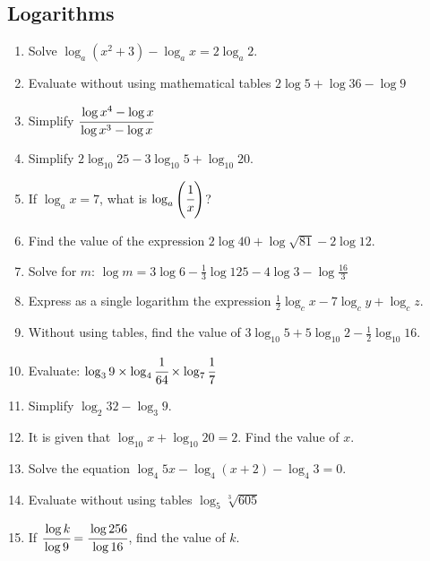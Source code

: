 	
	
	\subsection{Logarithms}
\begin{enumerate}

	\item Solve $\log_a(x^2 + 3) - \log_ax = 2\log_a2$.
	
	\item Evaluate without using mathematical tables $2\log 5 + \log 36 - \log 9$	
	
	\item Simplify $\cfrac{\log x^4 - \log x}{\log x^3 - \log x}$

	\item Simplify $2\log_{10} 25 - 3\log_{10} 5 + \log_{10} 20$.
	
	\item If $\log_a x = 7$, what is $\log_a \left(\cfrac{1}{x}\right)$?
	
	\item Find the value of the expression $2\log 40 + \log \sqrt{81} - 2\log 12$.
	
	\item Solve for $m$: $\log m = 3\log 6 - \frac{1}{3}\log 125 - 4\log 3 - \log \frac{16}{3}$

	\item Express as a single logarithm the expression $\frac{1}{2}\log_c x - 7\log_c y + \log_c z$.
	
	\item Without using tables, find the value of $3\log_{10} 5 + 5\log_{10} 2 - \frac{1}{2}\log_{10} 16$.
	
	\item Evaluate: $\log_3 9 \times \log_4 \cfrac{1}{64} \times \log_7 \cfrac{1}{7}$
	
	\item Simplify $\log_2 32 - \log_3 9$.
	
	\item It is given that $\log_{10} x + \log_{10} 20 = 2$. Find the value of $x$.
	
	\item Solve the equation $\log_4 5x - \log_4 (x + 2) - \log_4 3 = 0$.
	
	\item Evaluate without using tables $\log_5 \sqrt[3]{605}$
	
	\item If $\cfrac{\log k}{\log 9} = \cfrac{\log 256}{\log 16}$, find the value of $k$.
	

\end{enumerate}
